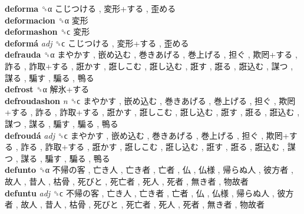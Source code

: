 \textbf{deforma} ␝α   こじつける ,  変形+する ,  歪める   \\
\textbf{deformacion} ␝α   変形   \\
\textbf{deformashon} ␝ϲ   変形   \\
\textbf{deformá} \emph{adj}  ␝ϲ   こじつける ,  変形+する ,  歪める   \\
\textbf{defrauda} ␝α   まやかす ,  嵌め込む ,  巻きあげる ,  巻上げる ,  担ぐ ,  欺罔+する ,  詐る ,  詐取+する ,  誑かす ,  誑しこむ ,  誑し込む ,  誑す ,  誑る ,  誑込む ,  謀つ ,  謀る ,  騙す ,  騙る ,  鴨る   \\
\textbf{defrost} ␝α   解氷+する   \\
\textbf{defroudashon} \emph{n}  ␝ϲ   まやかす ,  嵌め込む ,  巻きあげる ,  巻上げる ,  担ぐ ,  欺罔+する ,  詐る ,  詐取+する ,  誑かす ,  誑しこむ ,  誑し込む ,  誑す ,  誑る ,  誑込む ,  謀つ ,  謀る ,  騙す ,  騙る ,  鴨る   \\
\textbf{defroudá} \emph{adj}  ␝ϲ   まやかす ,  嵌め込む ,  巻きあげる ,  巻上げる ,  担ぐ ,  欺罔+する ,  詐る ,  詐取+する ,  誑かす ,  誑しこむ ,  誑し込む ,  誑す ,  誑る ,  誑込む ,  謀つ ,  謀る ,  騙す ,  騙る ,  鴨る   \\
\textbf{defunto} ␝α   不帰の客 ,  亡き人 ,  亡き者 ,  亡者 ,  仏 ,  仏様 ,  帰らぬ人 ,  彼方者 ,  故人 ,  昔人 ,  枯骨 ,  死びと ,  死亡者 ,  死人 ,  死者 ,  無き者 ,  物故者   \\
\textbf{defuntu} \emph{adj}  ␝ϲ   不帰の客 ,  亡き人 ,  亡き者 ,  亡者 ,  仏 ,  仏様 ,  帰らぬ人 ,  彼方者 ,  故人 ,  昔人 ,  枯骨 ,  死びと ,  死亡者 ,  死人 ,  死者 ,  無き者 ,  物故者   \\
